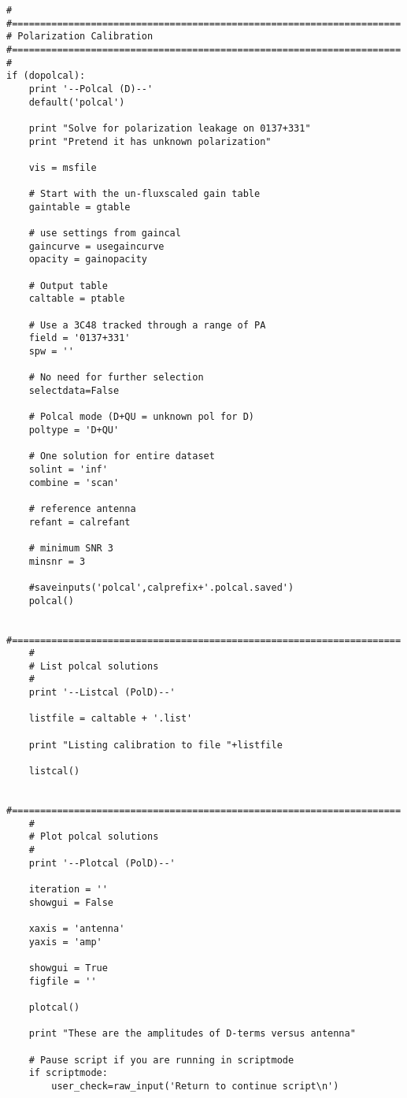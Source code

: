 \begin{verbatim}
#
#=====================================================================
# Polarization Calibration
#=====================================================================
#
if (dopolcal):
    print '--Polcal (D)--'
    default('polcal')
    
    print "Solve for polarization leakage on 0137+331"
    print "Pretend it has unknown polarization"

    vis = msfile

    # Start with the un-fluxscaled gain table
    gaintable = gtable

    # use settings from gaincal
    gaincurve = usegaincurve
    opacity = gainopacity
    
    # Output table
    caltable = ptable

    # Use a 3C48 tracked through a range of PA
    field = '0137+331'
    spw = ''

    # No need for further selection
    selectdata=False

    # Polcal mode (D+QU = unknown pol for D)
    poltype = 'D+QU'

    # One solution for entire dataset
    solint = 'inf'
    combine = 'scan'

    # reference antenna
    refant = calrefant

    # minimum SNR 3
    minsnr = 3

    #saveinputs('polcal',calprefix+'.polcal.saved')
    polcal()
    
    #=====================================================================
    #
    # List polcal solutions
    #
    print '--Listcal (PolD)--'

    listfile = caltable + '.list'

    print "Listing calibration to file "+listfile

    listcal()
    
    #=====================================================================
    #
    # Plot polcal solutions
    #
    print '--Plotcal (PolD)--'
    
    iteration = ''
    showgui = False
    
    xaxis = 'antenna'
    yaxis = 'amp'

    showgui = True
    figfile = ''

    plotcal()

    print "These are the amplitudes of D-terms versus antenna"

    # Pause script if you are running in scriptmode
    if scriptmode:
        user_check=raw_input('Return to continue script\n')


\end{verbatim}
